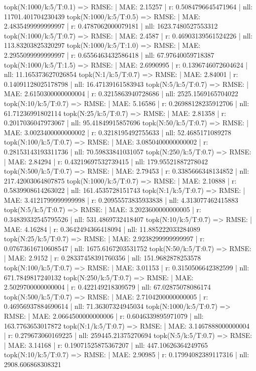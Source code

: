 topk(N:1000/k:5/T:0.1) => RMSE: | MAE: 2.15257 | r: 0.5084796645471964 | nll: 11701.401704230439
topk(N:1000/k:5/T:0.5) => RMSE: | MAE: 2.4835499999999997 | r: 0.4787062000079181 | nll: 1623.7480527553312
topk(N:1000/k:5/T:0.7) => RMSE: | MAE: 2.4587 | r: 0.46903139561524226 | nll: 113.83203825320297
topk(N:1000/k:5/T:1.0) => RMSE: | MAE: 2.2955099999999997 | r: 0.6556463432586418 | nll: 67.97640059718387
topk(N:1000/k:5/T:1.5) => RMSE: | MAE: 2.6990995 | r: 0.1396746072604624 | nll: 11.165373627026854
topk(N:1/k:5/T:0.7) => RMSE: | MAE: 2.84001 | r: 0.14091128025178798 | nll: 16.47139161583943
topk(N:5/k:5/T:0.7) => RMSE: | MAE: 2.6150300000000004 | r: 0.3215863940728686 | nll: 2525.1569165704022
topk(N:10/k:5/T:0.7) => RMSE: | MAE: 5.16586 | r: 0.26988128235912706 | nll: 61.71236991802114
topk(N:25/k:5/T:0.7) => RMSE: | MAE: 2.81358 | r: 0.2017036047973067 | nll: 95.41849915857696
topk(N:50/k:5/T:0.7) => RMSE: | MAE: 3.0023400000000002 | r: 0.3218195492755633 | nll: 52.4685171089278
topk(N:100/k:5/T:0.7) => RMSE: | MAE: 3.0850400000000002 | r: 0.28153143193311736 | nll: 70.59833841031057
topk(N:250/k:5/T:0.7) => RMSE: | MAE: 2.84294 | r: 0.43219697532739415 | nll: 179.95521887278042
topk(N:500/k:5/T:0.7) => RMSE: | MAE: 2.79453 | r: 0.3385666348134852 | nll: 217.42003064807875
topk(N:1000/k:5/T:0.7) => RMSE: | MAE: 2.10888 | r: 0.5839908614263022 | nll: 161.4535728151743
topk(N:1/k:5/T:0.7) => RMSE: | MAE: 3.4121799999999998 | r: 0.20955573835933838 | nll: 4.313077462415883
topk(N:5/k:5/T:0.7) => RMSE: | MAE: 3.2023600000000005 | r: 0.34839332545795526 | nll: 531.4869732418407
topk(N:10/k:5/T:0.7) => RMSE: | MAE: 4.16284 | r: 0.3642494366418094 | nll: 11.885222033284089
topk(N:25/k:5/T:0.7) => RMSE: | MAE: 2.9238299999999997 | r: 0.07673616710608547 | nll: 1675.6167203531752
topk(N:50/k:5/T:0.7) => RMSE: | MAE: 2.9152 | r: 0.28337458391760356 | nll: 151.9682878253578
topk(N:100/k:5/T:0.7) => RMSE: | MAE: 3.01153 | r: 0.3150506642382599 | nll: 671.7849817240132
topk(N:250/k:5/T:0.7) => RMSE: | MAE: 2.5029700000000004 | r: 0.422149218309579 | nll: 67.02875078086174
topk(N:500/k:5/T:0.7) => RMSE: | MAE: 2.7104200000000005 | r: 0.46956937884690614 | nll: 71.36307324945034
topk(N:1000/k:5/T:0.7) => RMSE: | MAE: 2.0664500000000006 | r: 0.6046339895971079 | nll: 163.7763653017872
topk(N:1/k:5/T:0.7) => RMSE: | MAE: 3.1467888000000004 | r: 0.279673060169225 | nll: 259445.21375270694
topk(N:5/k:5/T:0.7) => RMSE: | MAE: 3.14168 | r: 0.19071525875367207 | nll: 447.10626364249765
topk(N:10/k:5/T:0.7) => RMSE: | MAE: 2.90985 | r: 0.17994082389117316 | nll: 2908.606868308321
